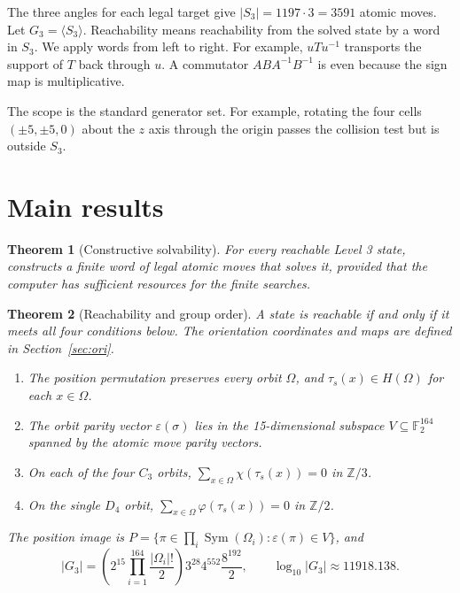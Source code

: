 \documentclass[a4paper,11pt]{article}
\newtheorem{theorem}{Theorem}[section]
\theoremstyle{definition}
\newcommand{\Sym}{\operatorname{Sym}}
\newcommand{\code}[1]{\path{#1}}
\begin{document}
The three angles for each legal target give $|S_3|=1197\cdot3=3591$
atomic moves. Let $G_3=\langle S_3\rangle$. Reachability means
reachability from the solved state by a word in $S_3$. We apply words
from left to right. For example, $uTu^{-1}$ transports the support of $T$
back through $u$. A commutator $ABA^{-1}B^{-1}$ is even because the sign
map is multiplicative.

The scope is the standard generator set. For example, rotating the four
cells $(\pm5,\pm5,0)$ about the $z$ axis through the origin passes the
collision test but is outside $S_3$.

\section{Main results}
\begin{theorem}[Constructive solvability]\label{thm:main}
For every reachable Level 3 state, \code{level3-slice-reduction} constructs
a finite word of legal atomic moves that solves it, provided that the
computer has sufficient resources for the finite searches.
\end{theorem}

\begin{theorem}[Reachability and group order]\label{thm:structure}
A state is reachable if and only if it meets all four conditions below.
The orientation coordinates and maps are defined in Section~\ref{sec:ori}.
\begin{enumerate}
\item The position permutation preserves every orbit $\Omega$, and
$\tau_s(x)\in H(\Omega)$ for each $x\in\Omega$.
\item The orbit parity vector $\varepsilon(\sigma)$ lies in the
15-dimensional subspace $V\subseteq\mathbb F_2^{164}$ spanned by the
atomic move parity vectors.
\item On each of the four $C_3$ orbits, $\sum_{x\in\Omega}\chi(\tau_s(x))=0$
in $\mathbb Z/3$.
\item On the single $D_4$ orbit, $\sum_{x\in\Omega}\varphi(\tau_s(x))=0$
in $\mathbb Z/2$.
\end{enumerate}
The position image is
$P=\{\pi\in\prod_i\Sym(\Omega_i):\varepsilon(\pi)\in V\}$, and
\[
|G_3|=\left(2^{15}\prod_{i=1}^{164}\frac{|\Omega_i|!}{2}\right)
       3^{28}4^{552}\frac{8^{192}}2,\qquad
\log_{10}|G_3|\approx11918.138.
\]
\end{theorem}
\end{document}
